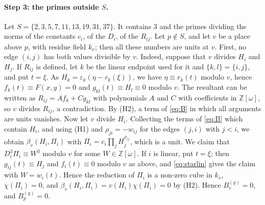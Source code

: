 \documentclass[11pt]{article}
\newcommand{\Z}{\mathbb{Z}}
\begin{document}
\paragraph{Step 3: the primes outside $S$.} Let $S=\{2,3,5,7,11,13,19,31,37\}$. It contains $3$ and the primes dividing the norms of the constants $c_i$, of the $D_i$, of the $R_{ij}$. Let $p\notin S$, and let $v$ be a place above $p$, with residue field $k_v$; then all these numbers are units at $v$. First, no edge $(i,j)$ has both values divisible by $v$. Indeed, suppose that $v$ divides $H_i$ and $H_j$. If $R_{ij}$ is defined, let $k$ be the linear endpoint used for it and $\{k,l\}=\{i,j\}$, and put $t=\xi$. As $H_k=\varepsilon_k(\eta-r_k(\xi))$, we have $\eta\equiv r_k(t)$ modulo $v$, hence $f_k(t)\equiv F(x,y)=0$ and $g_{kl}(t)\equiv H_l\equiv0$ modulo $v$. The resultant can be written as $R_{ij}=Af_k+Cg_{kl}$ with polynomials $A$ and $C$ with coefficients in $\Z[\omega]$, so $v$ divides $R_{ij}$, a contradiction. By (H2), a term of \eqref{eq:B} in which all arguments are units vanishes. Now let $v$ divide $H_i$. Collecting the terms of \eqref{eq:B} which contain $H_i$, and using (H1) and $\rho_{ji}=-w_{ij}$ for the edges $(j,i)$ with $j<i$, we obtain $\beta_v(H_i,\Pi_i)$ with $\Pi_i=c_i\prod_jH_j^{\rho_{ij}}$, which is a unit. We claim that $D_i^3\Pi_i\equiv W^3$ modulo $v$ for some $W\in\Z[\omega]$. If $i$ is linear, put $t=\xi$; then $g_{ij}(t)\equiv H_j$ and $f_i(t)\equiv0$ modulo $v$ as above, and \eqref{eq:starlin} gives the claim with $W=w_i(t)$. Hence the reduction of $\Pi_i$ is a non-zero cube in $k_v$, $\chi(\Pi_i)=0$, and $\beta_v(H_i,\Pi_i)=v(H_i)\chi(\Pi_i)=0$ by (H2). Hence $B^{(g)}_v=0$, and $B^{(g)}_p=0$.
\end{document}
